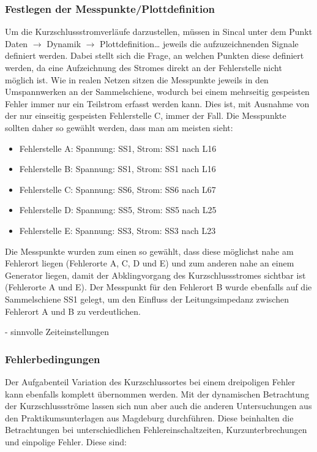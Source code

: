 \documentclass{scrartcl}
\begin{document}
\begin{onehalfspace}
\subsubsection{Festlegen der Messpunkte/Plottdefinition}
Um die Kurzschlussstromverläufe darzustellen, müssen in Sincal unter dem Punkt Daten $\rightarrow$ Dynamik $\rightarrow$ Plottdefinition… jeweils die aufzuzeichnenden Signale definiert werden. Dabei stellt sich die Frage, an welchen Punkten diese definiert werden, da eine Aufzeichnung des Stromes direkt an der Fehlerstelle nicht möglich ist. Wie in realen Netzen sitzen die Messpunkte jeweils in den Umspannwerken an der Sammelschiene, wodurch bei einem mehrseitig gespeisten Fehler immer nur ein Teilstrom erfasst werden kann. Dies ist, mit Ausnahme von der nur einseitig gespeisten Fehlerstelle C, immer der Fall. Die Messpunkte sollten daher so gewählt werden, dass man \glqq am meisten sieht\grqq:

\begin{itemize}
\item Fehlerstelle A: Spannung: SS1, Strom: SS1 nach L16
\item Fehlerstelle B: Spannung: SS1, Strom: SS1 nach L16
\item Fehlerstelle C: Spannung: SS6, Strom: SS6 nach L67
\item Fehlerstelle D: Spannung: SS5, Strom: SS5 nach L25
\item Fehlerstelle E: Spannung: SS3, Strom: SS3 nach L23
\end{itemize}

Die Messpunkte wurden zum einen so gewählt, dass diese möglichst nahe am Fehlerort liegen (Fehlerorte A, C, D und E) und zum anderen nahe an einem Generator liegen, damit der Abklingvorgang des Kurzschlussstromes sichtbar ist (Fehlerorte A und E). Der Messpunkt für den Fehlerort B wurde ebenfalls auf die Sammelschiene SS1 gelegt, um den Einfluss der Leitungsimpedanz zwischen Fehlerort A und B zu verdeutlichen.

- sinnvolle Zeiteinstellungen

\subsubsection{Fehlerbedingungen}
Der Aufgabenteil \glqq Variation des Kurzschlussortes bei einem dreipoligen Fehler\grqq{} kann ebenfalls komplett übernommen werden. Mit der dynamischen Betrachtung der Kurzschlussströme lassen sich nun aber auch die anderen Untersuchungen aus den Praktikumsunterlagen aus Magdeburg durchführen. Diese beinhalten die Betrachtungen bei unterschiedlichen Fehlereinschaltzeiten, Kurzunterbrechungen und einpolige Fehler. Diese sind:


\end{onehalfspace}
\end{document}
